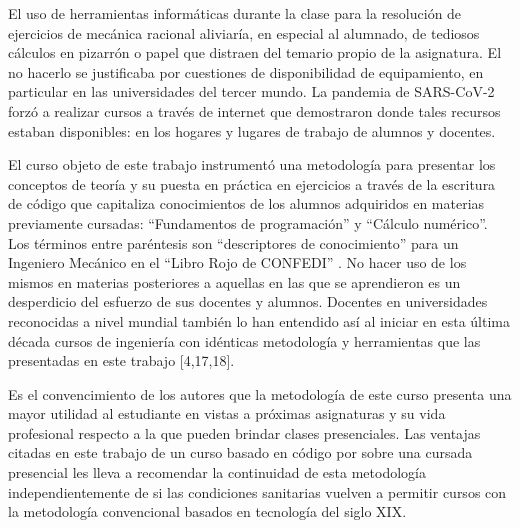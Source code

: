 El uso de herramientas informáticas durante la clase para la resolución de ejercicios de mecánica racional  aliviaría, en especial al alumnado, de tediosos cálculos en pizarrón o papel que distraen del temario propio de la asignatura. El no hacerlo se justificaba por cuestiones de disponibilidad de equipamiento, en particular en las universidades del tercer mundo. La pandemia de SARS-CoV-2 forzó a realizar cursos a través de internet que demostraron donde tales recursos estaban disponibles: en los hogares y lugares de trabajo de alumnos y docentes.

El curso objeto de este trabajo instrumentó una metodología para presentar los conceptos de teoría y su puesta en práctica en ejercicios a través de la escritura de código que capitaliza conocimientos de los alumnos adquiridos en materias previamente cursadas: “Fundamentos de programación” y “Cálculo numérico”. Los términos entre paréntesis son “descriptores de conocimiento” para un Ingeniero Mecánico en el “Libro Rojo de CONFEDI” \cite{librorojo}. No hacer uso de los mismos en materias posteriores a aquellas en las que se aprendieron es un desperdicio del esfuerzo de sus docentes y alumnos. Docentes en universidades reconocidas a nivel mundial también lo han entendido así al iniciar en esta última década cursos de ingeniería con idénticas metodología y herramientas que las presentadas en este trabajo \cite{barba_teaching_2019}  [4,17,18].

 Es el convencimiento de los autores que la metodología de este curso presenta una mayor utilidad al estudiante en vistas a próximas asignaturas y su vida profesional respecto a la que pueden brindar clases presenciales. Las ventajas citadas en este trabajo de un curso basado en código por sobre una cursada presencial les lleva a recomendar la continuidad de esta metodología independientemente de si las condiciones sanitarias vuelven a permitir cursos con la metodología convencional basados en tecnología del siglo XIX.